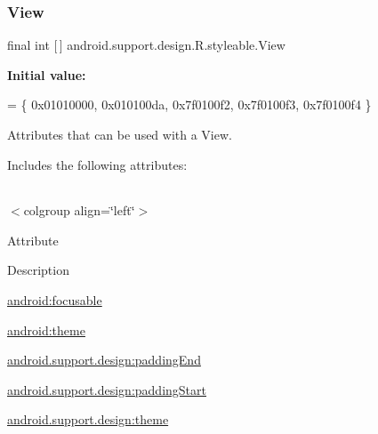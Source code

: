 \subsubsection{\texorpdfstring{View}{View}}
{\footnotesize\ttfamily final int \mbox{[}$\,$\mbox{]} android.\+support.\+design.\+R.\+styleable.\+View\hspace{0.3cm}{\ttfamily [static]}}

{\bfseries Initial value\+:}
\begin{DoxyCode}
= \{
            0x01010000, 0x010100da, 0x7f0100f2, 0x7f0100f3,
            0x7f0100f4
        \}
\end{DoxyCode}
Attributes that can be used with a View. 

Includes the following attributes\+:

\tabulinesep=1mm
\begin{longtabu} spread 0pt [c]{*{0}{|X[-1]}|}
\hline
\end{longtabu}
$<$colgroup align=\char`\"{}left\char`\"{}$>$ 

Attribute

Description 

{\ttfamily \hyperlink{classandroid_1_1support_1_1design_1_1R_1_1styleable_a1e688704d10e03014118a9af99770e9d}{android\+:focusable}}

{\ttfamily \hyperlink{classandroid_1_1support_1_1design_1_1R_1_1styleable_a57c0fdcca2016b94e23a1f36f889f581}{android\+:theme}}

{\ttfamily \hyperlink{classandroid_1_1support_1_1design_1_1R_1_1styleable_afd6c00810c12a8e9da050dd3fc5d31ff}{android.\+support.\+design\+:padding\+End}}

{\ttfamily \hyperlink{classandroid_1_1support_1_1design_1_1R_1_1styleable_a39729af0c88068197b82555ede76dbd1}{android.\+support.\+design\+:padding\+Start}}

{\ttfamily \hyperlink{classandroid_1_1support_1_1design_1_1R_1_1styleable_a9ec1420eec04ffdfd76d5ad0ea0818ef}{android.\+support.\+design\+:theme}}

